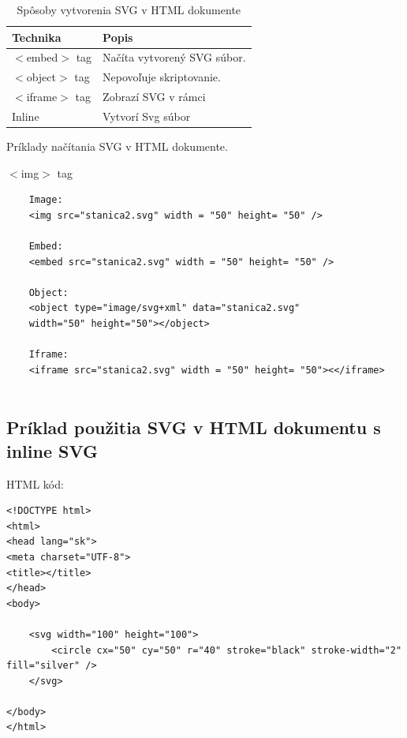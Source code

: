 \begin{table}[h]
	\begin{center}
		\begin{tabular}{|l|l|}
			\hline \textbf{Technika} & \textbf{Popis} \\ 
			\hline $<$embed$>$ tag & Načíta vytvorený SVG súbor.  \\ 
			\hline $<$object$>$ tag & Nepovoľuje skriptovanie.  \\ 
			\hline $<$iframe$>$ tag & Zobrazí SVG v rámci  \\ 
			\hline Inline & Vytvorí Svg súbor \\ 
			\hline 
		\end{tabular} 
	\end{center}
	\caption{Spôsoby vytvorenia SVG v HTML dokumente}
	\label{vytvorenie:SVG}
\end{table}

Príklady načítania SVG v HTML dokumente.

$<$img$>$ tag 

\begin{lstlisting}
	Image:
	<img src="stanica2.svg" width = "50" height= "50" />
	
	Embed:
	<embed src="stanica2.svg" width = "50" height= "50" />
	
	Object:
	<object type="image/svg+xml" data="stanica2.svg"
	width="50" height="50"></object>
	
	Iframe:
	<iframe src="stanica2.svg" width = "50" height= "50"><</iframe>
	
\end{lstlisting}






\subsection{Príklad použitia SVG v HTML dokumentu s inline SVG }

HTML kód: 

\begin{lstlisting}
<!DOCTYPE html>
<html>
<head lang="sk">
<meta charset="UTF-8">
<title></title>
</head>
<body>

	<svg width="100" height="100">
		<circle cx="50" cy="50" r="40" stroke="black" stroke-width="2" fill="silver" />
	</svg>	
	
</body>
</html>

\end{lstlisting}




